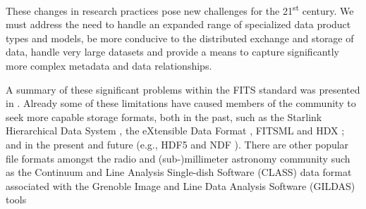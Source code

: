 \documentclass[final,authoryear,5p,times,twocolumn]{elsarticle}
\begin{document}
These changes in research practices pose new challenges for the
21\textsuperscript{st} century. We must address the need to handle an
expanded range of specialized data product types and models, be more
conducive to the distributed exchange and storage of data, handle very
large datasets and provide a means to capture significantly more complex
metadata and data relationships.


A summary of these significant problems within the FITS standard was
presented in \citet{P90_adassxxiii}.  Already some of these limitations
have caused members of the community to seek more capable storage
formats, both in the past, such as the Starlink Hierarchical Data System
\citep[HDS;][]{1982QJRAS..23..485D}, the eXtensible Data Format
\citep[XDF;][]{2001ASPC..238..217S}, FITSML \citep{2001ASPC..238..487T}
and HDX \citep{2003ASPC..295..221G}; and in the present and future
(e.g., HDF5 \citep{2011ASPC..442...53A} and NDF \citep{2014Jenness}).
There are other popular file formats amongst the
radio and (sub-)millimeter astronomy community such as the Continuum and
Line Analysis Single-dish Software (CLASS) data format associated with
the Grenoble Image and Line Data Analysis Software (GILDAS) tools
\end{document}
